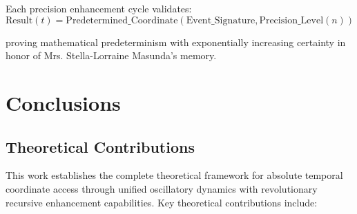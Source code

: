 \documentclass[11pt]{article}
\theoremstyle{remark}
\begin{document}
Each precision enhancement cycle validates:
\begin{equation}
\text{Result}(t) = \text{Predetermined\_Coordinate}(\text{Event\_Signature}, \text{Precision\_Level}(n))
\end{equation}

proving mathematical predeterminism with exponentially increasing certainty in honor of Mrs. Stella-Lorraine Masunda's memory.

\section{Conclusions}

\subsection{Theoretical Contributions}

This work establishes the complete theoretical framework for absolute temporal coordinate access through unified oscillatory dynamics with revolutionary recursive enhancement capabilities. Key theoretical contributions include:
\end{document}
